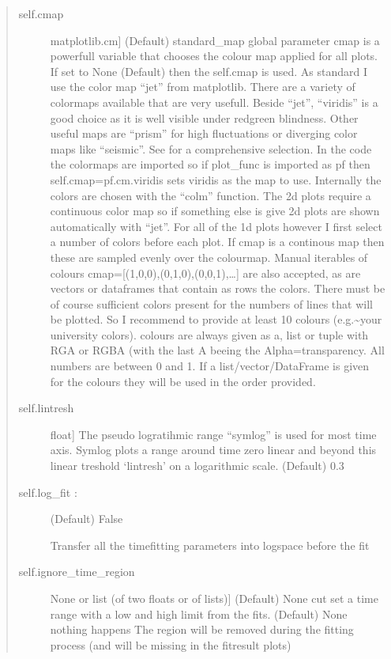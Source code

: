 \documentclass[letterpaper,10pt,english]{sphinxmanual}
\begin{document}
\begin{fulllineitems}
\begin{fulllineitems}
\begin{quote}
\begin{description}
\item[{self.cmap}] \leavevmode{[}matplotlib.cm{]}
(Default)  standard\_map \sphinxhyphen{} global parameter
cmap is a powerfull variable that chooses the colour map applied for all plots. If set to
None (Default) then the self.cmap is used.
As standard I use the color map “jet” from matplotlib. There are a variety of colormaps
available that are very usefull. Beside “jet”, “viridis” is a good choice as it is well
visible under red\sphinxhyphen{}green blindness. Other useful maps are “prism” for high fluctuations
or diverging color maps like “seismic”.
See  for a comprehensive
selection. In the code the colormaps are imported so if plot\_func is imported as pf then
self.cmap=pf.cm.viridis sets viridis as the map to use. Internally the colors are chosen
with the “colm” function. The 2d plots require a continuous color map so if something
else is give 2d plots are shown automatically with “jet”. For all of the 1d plots however
I first select a number of colors before each plot. If cmap is a continous map then these
are sampled evenly over the colourmap. Manual iterables of colours
cmap={[}(1,0,0),(0,1,0),(0,0,1),…{]} are also accepted, as are vectors or dataframes that
contain as rows the colors. There must be of course sufficient colors present for
the numbers of lines that will be plotted. So I recommend to provide at least 10 colours
(e.g.\textasciitilde{}your university colors). colours are always given as a, list or tuple with RGA or RGBA
(with the last A beeing the Alpha=transparency. All numbers are between 0 and 1.
If a list/vector/DataFrame is given for the colours they will be used in the order provided.

\item[{self.lintresh}] \leavevmode{[}float{]}
The pseudo logratihmic range “symlog” is used for most time axis. Symlog plots a range around
time zero linear and beyond this linear treshold ‘lintresh’ on a logarithmic scale. (Default) 0.3

\item[{self.log\_fit  :}] \leavevmode
(Default)  False

Transfer all the time\sphinxhyphen{}fitting parameters into log\sphinxhyphen{}space before the fit

\item[{self.ignore\_time\_region}] \leavevmode{[}None or list (of two floats or of lists){]}
(Default)  None
cut set a time range with a low and high limit from the fits. (Default) None nothing happens
The region will be removed during the fitting process (and will be missing in the fit\sphinxhyphen{}result
plots)


\end{description}
\end{quote}
\end{fulllineitems}
\end{fulllineitems}
\end{document}

